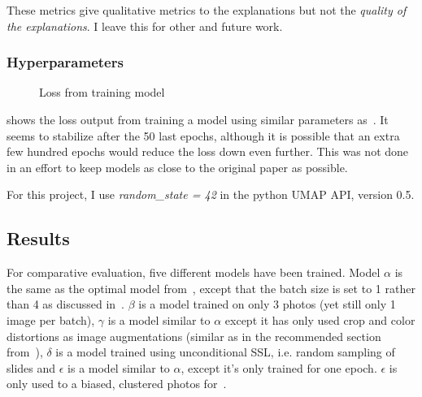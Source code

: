 \documentclass[10pt,twocolumn,letterpaper]{article}
\begin{document}
These metrics give qualitative metrics to the explanations but not the \textit{quality of the explanations}. I leave this for other and future work.

\subsubsection{Hyperparameters}

\begin{figure}\label{fig:loss}
\caption{Loss from training model}
\label{fig:defaultLoss}
\end{figure}

 shows the loss output from training a model using similar parameters as~\cite{sslUMAP}. It seems to stabilize after the 50 last epochs, although it is possible that an extra few hundred epochs would reduce the loss down even further. This was not done in an effort to keep models as close to the original paper as possible.

For this project, I use \textit{random\_state = 42} in the python \gls{UMAP} API, version 0.5.

\subsection{Results}\label{sec:results}

For comparative evaluation, five different models have been trained. Model $\alpha$ is the same as the optimal model from~\cite{sslUMAP}, except that the batch size is set to 1 rather than 4 as discussed in~. $\beta$ is a model trained on only 3 photos (yet still only 1 image per batch), $\gamma$ is a model similar to $\alpha$ except it has only used crop and color distortions as image augmentations (similar as in the recommended section from~\cite{simCLR}), $\delta$ is a model trained using unconditional \gls{SSL}, i.e. random sampling of slides and $\epsilon$ is a model similar to $\alpha$, except it's only trained for one epoch. $\epsilon$ is only used to a biased, clustered photos for~.

\end{document}
